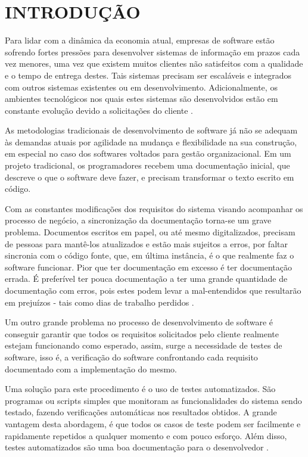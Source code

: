 \chapter{INTRODUÇÃO}

Para lidar com a dinâmica da economia atual, empresas de software estão sofrendo fortes pressões para desenvolver sistemas de informação em prazos cada vez menores, uma vez que existem muitos clientes não satisfeitos com a qualidade e o tempo de entrega destes. Tais sistemas precisam ser escaláveis e integrados com outros sistemas existentes ou em desenvolvimento. Adicionalmente, os ambientes tecnológicos nos quais estes sistemas são desenvolvidos estão em constante evolução devido a solicitações do cliente \cite{CRESPO}.

As metodologias tradicionais de desenvolvimento de software já não se adequam às demandas atuais por agilidade na mudança e flexibilidade na sua construção, em especial no caso dos softwares voltados para gestão organizacional. Em um projeto tradicional, os programadores recebem uma documentação inicial, que descreve o que o software deve fazer, e precisam transformar o texto escrito em código.

Com as constantes modificações dos requisitos do sistema visando acompanhar os processo de negócio, a sincronização da documentação torna-se um grave problema. Documentos escritos em papel, ou até mesmo digitalizados, precisam de pessoas para mantê-los atualizados e estão mais sujeitos a erros, por faltar sincronia com o código fonte, que, em última instância, é o que realmente faz o software funcionar. Pior que ter documentação em excesso é ter documentação errada. É preferível ter pouca documentação a ter uma grande quantidade de documentação com erros, pois estes podem levar a mal-entendidos que resultarão em prejuízos - tais como dias de trabalho perdidos \cite{NSI}.

Um outro grande problema no processo de desenvolvimento de software é conseguir garantir que todos os requisitos solicitados pelo cliente realmente estejam funcionando como esperado, assim, surge a necessidade de testes de software, isso é, a verificação do software confrontando cada requisito documentado com a implementação do mesmo.

Uma solução para este procedimento é o uso de testes automatizados. São programas ou scripts simples que monitoram as funcionalidades do sistema sendo testado, fazendo verificações automáticas nos resultados obtidos. A grande vantagem desta abordagem, é que todos os casos de teste podem ser facilmente e rapidamente repetidos a qualquer momento e com pouco esforço. Além disso, testes automatizados são uma boa documentação para o desenvolvedor \cite{KON}.

